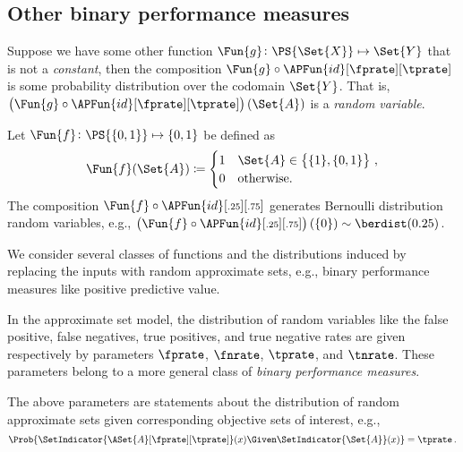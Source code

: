 \documentclass[ ../main.tex]{subfiles}
\begin{document}
\subsection{Other binary performance measures}
\label{sec:perf}
Suppose we have some other function $\Fun{g} \colon \PS{\Set{X}} \mapsto \Set{Y}$ that is not a \emph{constant}, then the composition $\Fun{g} \circ \APFun{id}[\fprate][\tprate]$ is some probability distribution over the codomain $\Set{Y}$.
That is, $\left(\Fun{g} \circ \APFun{id}[\fprate][\tprate]\right)(\Set{A})$ is a \emph{random variable}.
\begin{example}
	Let $\Fun{f} \colon \PS{\{0,1\}} \mapsto \{0,1\}$ be defined as
	\begin{equation}
	\Fun{f}(\Set{A}) \coloneqq
	\begin{cases}
	1 & \Set{A} \in \left\{\{1\},\{0,1\}\right\}\,,\\
	0 & \text{otherwise.}
	\end{cases}
	\end{equation}
	The composition $\Fun{f} \circ \APFun{id}[\mathsmaller{.25}][\mathsmaller{.75}]$ generates Bernoulli distribution random variables, e.g., $\left(\Fun{f} \circ \APFun{id}[\mathsmaller{.25}][\mathsmaller{.75}]\right)(\{0\}) \sim \berdist(0.25)$.
\end{example}

We consider several classes of functions and the distributions induced by replacing the inputs with random approximate sets, e.g., binary performance measures like positive predictive value.


In the approximate set model, the distribution of random variables like the false positive, false negatives, true positives, and true negative rates are given respectively by parameters $\fprate$, $\fnrate$, $\tprate$, and $\tnrate$.
These parameters belong to a more general class of \emph{binary performance measures}.

The above parameters are statements about the distribution of random approximate sets given corresponding objective sets of interest, e.g.,
\begin{equation}
\Prob{\SetIndicator{\ASet{A}[\fprate][\tprate]}(x) \Given 
	\SetIndicator{\Set{A}}(x)} = \tprate\,.
\end{equation}
\end{document}
